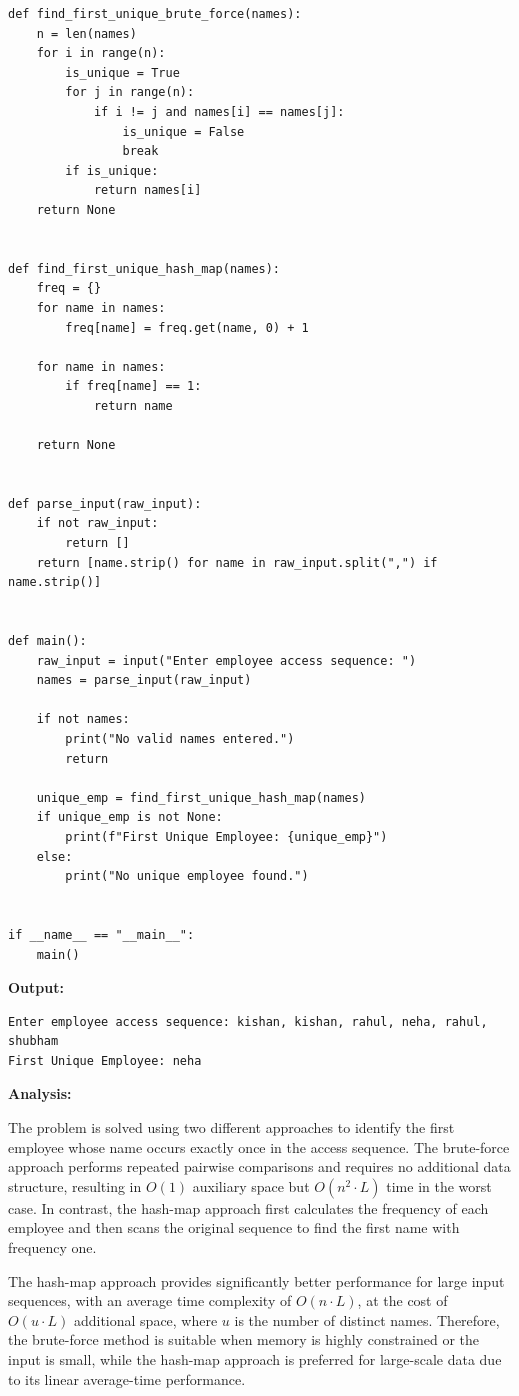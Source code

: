 \documentclass[12pt]{article}
\begin{document}
\begin{lstlisting}[style=code]
def find_first_unique_brute_force(names):
    n = len(names)
    for i in range(n):
        is_unique = True
        for j in range(n):
            if i != j and names[i] == names[j]:
                is_unique = False
                break
        if is_unique:
            return names[i]
    return None


def find_first_unique_hash_map(names):
    freq = {}
    for name in names:
        freq[name] = freq.get(name, 0) + 1

    for name in names:
        if freq[name] == 1:
            return name

    return None


def parse_input(raw_input):
    if not raw_input:
        return []
    return [name.strip() for name in raw_input.split(",") if name.strip()]


def main():
    raw_input = input("Enter employee access sequence: ")
    names = parse_input(raw_input)

    if not names:
        print("No valid names entered.")
        return

    unique_emp = find_first_unique_hash_map(names)
    if unique_emp is not None:
        print(f"First Unique Employee: {unique_emp}")
    else:
        print("No unique employee found.")


if __name__ == "__main__":
    main()
\end{lstlisting}

\textbf{Output:}

\begin{lstlisting}[style=output]
Enter employee access sequence: kishan, kishan, rahul, neha, rahul, shubham
First Unique Employee: neha
\end{lstlisting}
\newpage
\textbf{Analysis:}

The problem is solved using two different approaches to identify the first employee whose name occurs exactly once in the access sequence. The brute-force approach performs repeated pairwise comparisons and requires no additional data structure, resulting in $O(1)$ auxiliary space but $O(n^2 \cdot L)$ time in the worst case. In contrast, the hash-map approach first calculates the frequency of each employee and then scans the original sequence to find the first name with frequency one.

The hash-map approach provides significantly better performance for large input sequences, with an average time complexity of $O(n \cdot L)$, at the cost of $O(u \cdot L)$ additional space, where $u$ is the number of distinct names. Therefore, the brute-force method is suitable when memory is highly constrained or the input is small, while the hash-map approach is preferred for large-scale data due to its linear average-time performance.
\end{document}

